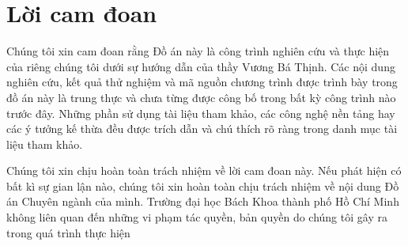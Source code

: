 \section*{Lời cam đoan}
\thispagestyle{empty}

Chúng tôi xin cam đoan rằng Đồ án này là công trình nghiên cứu và thực hiện của riêng chúng tôi dưới sự hướng dẫn của thầy Vương Bá Thịnh. Các nội dung nghiên cứu, kết quả thử nghiệm và mã nguồn chương trình được trình bày trong đồ án này là trung thực và chưa từng được công bố trong bất kỳ công trình nào trước đây. Những phần sử dụng tài liệu tham khảo, các công nghệ nền tảng hay các ý tưởng kế thừa đều được trích dẫn và chú thích rõ ràng trong danh mục tài liệu tham khảo.

Chúng tôi xin chịu hoàn toàn trách nhiệm về lời cam đoan này. Nếu phát hiện có bất kì sự gian lận nào, chúng tôi xin hoàn toàn chịu trách nhiệm về nội dung Đồ án Chuyên ngành của mình. Trường đại học Bách Khoa thành phố Hồ Chí Minh không liên quan đến những vi phạm tác quyền, bản quyền do chúng tôi gây ra trong quá trình thực hiện
\clearpage
{}